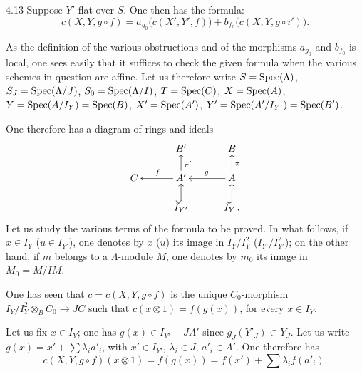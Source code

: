 \begin{proposition}{4.13}\label{III.4.13}
Suppose \(Y'\) flat over \(S\). One then has the formula:
\[
c(X,Y,g\circ f)
=a_{g_0}\bigl(c(X',Y',f)\bigr)
+b_{f_0}\bigl(c(X,Y,g\circ i')\bigr).
\]
\end{proposition}

As the definition of the various obstructions and of the morphisms
\(a_{g_0}\) and \(b_{f_0}\) is local, one sees easily that it suffices to
check the given formula when the various schemes in question are affine.
Let us therefore write \(S=\operatorname{Spec}(\Lambda)\), \(S_J=\operatorname{Spec}(\Lambda/J)\),
\(S_0=\operatorname{Spec}(\Lambda/I)\), \(T=\operatorname{Spec}(C)\), \(X=\operatorname{Spec}(A)\),
\(Y=\operatorname{Spec}(A/I_Y)=\operatorname{Spec}(B)\), \(X'=\operatorname{Spec}(A')\),
\(Y'=\operatorname{Spec}(A'/I_{Y'})=\operatorname{Spec}(B')\).

One therefore has a diagram of rings and ideals%
{\renewcommand{\thefootnote}{(104)}}
\[
\xymatrix@C=3em@R=1.55em{
& B' & B \\
C & A' \ar[l]_{f} \ar[u]_{\pi'} & A \ar[l]_{g} \ar[u]_{\pi} \\
& I_{Y'} \ar@{^{(}->}[u] & I_Y \ar@{^{(}->}[u]\,.
}
\]
Let us study the various terms of the formula to be proved. In what
follows, if \(x\in I_Y\) (\resp \(u\in I_{Y'}\)), one denotes by \(x\)
(\resp \(u\)) its image in \(I_Y/I_Y^2\)
(\resp \(I_{Y'}/I_{Y'}^2\)); on the other hand, if \(m\) belongs to a
\(\Lambda\)-module \(M\), one denotes by \(m_0\) its image in
\(M_0=M/IM\).

One has seen that \(c=c(X,Y,g\circ f)\) is the unique \(C_0\)-morphism
\(I_Y/I_Y^2\otimes_B C_0\to JC\) such that \(c(x\otimes 1)=f(g(x))\), for
every \(x\in I_Y\).

Let us fix \(x\in I_Y\); one has \(g(x)\in I_{Y'}+JA'\) since
\(g_J(Y'_J)\subset Y_J\). Let us write
\(g(x)=x'+\sum\lambda_i a'_i\), with \(x'\in I_{Y'}\), \(\lambda_i\in J\),
\(a'_i\in A'\). One therefore has
\begin{equation}
c(X,Y,g\circ f)(x\otimes 1)
=f(g(x))=f(x')+\sum\lambda_i f(a'_i).
\tag{1}
\end{equation}

